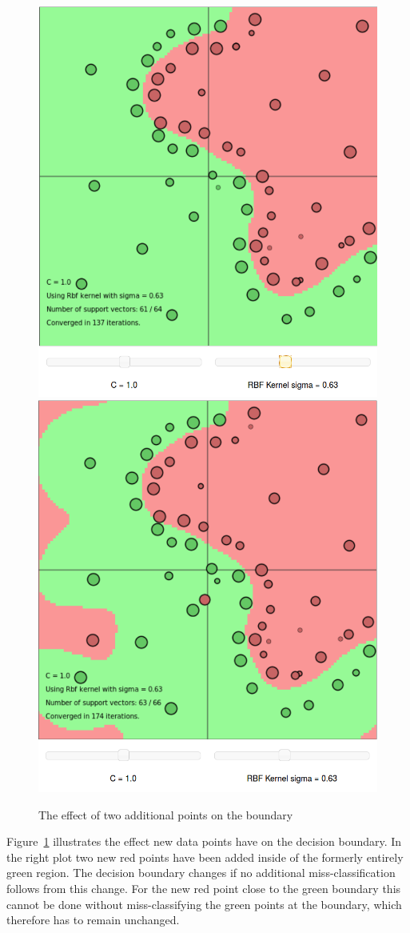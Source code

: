 \begin{figure}
\centering
\includegraphics[width=0.33\linewidth]{../src/figure/largeRBF}
\includegraphics[width=0.33\linewidth]{../src/figure/twoNewPoints}
\caption{The effect of two additional points on the boundary}
\label{fig:twoNewPoints}
\end{figure}
Figure~\ref{fig:twoNewPoints} illustrates the effect new data points have on the decision boundary. In the right plot two new red points have been added inside of the formerly entirely green region. The decision boundary changes if no additional miss-classification follows from this change. For the new red point close to the green boundary this cannot be done without miss-classifying the green points at the boundary, which therefore has to remain unchanged. 

